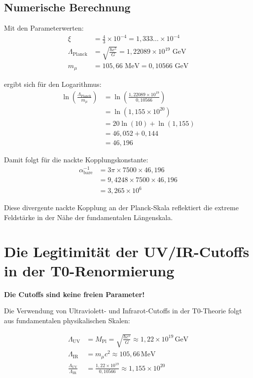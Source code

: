 \documentclass[12pt,a4paper]{article}
\theoremstyle{definition}
\begin{document}
	\subsection{Numerische Berechnung}
	
	Mit den Parameterwerten:
	\begin{align}
		\xi &= \frac{4}{3} \times 10^{-4} = 1{,}333\ldots \times 10^{-4}\\
		\Lambda_{\text{Planck}} &= \sqrt{\frac{\hbar c^5}{G}} = 1{,}22089 \times 10^{19} \text{ GeV}\\
		m_{\mu} &= 105{,}66 \text{ MeV} = 0{,}10566 \text{ GeV}
	\end{align}
	
	ergibt sich für den Logarithmus:
	\begin{align}
		\ln\left(\frac{\Lambda_{\text{Planck}}}{m_{\mu}}\right) &= \ln\left(\frac{1{,}22089 \times 10^{19}}{0{,}10566}\right)\\
		&= \ln(1{,}155 \times 10^{20})\\
		&= 20 \ln(10) + \ln(1{,}155)\\
		&= 46{,}052 + 0{,}144\\
		&= 46{,}196
	\end{align}
	
	Damit folgt für die nackte Kopplungskonstante:
	\begin{align}
		\alpha_{\text{bare}}^{-1} &= 3\pi \times 7500 \times 46{,}196\\
		&= 9{,}4248 \times 7500 \times 46{,}196\\
		&= 3{,}265 \times 10^6
	\end{align}
	
	Diese divergente nackte Kopplung an der Planck-Skala reflektiert die extreme Feldstärke in der Nähe der fundamentalen Längenskala.
	
	\section{Die Legitimität der UV/IR-Cutoffs in der T0-Renormierung}
	
	\begin{tcolorbox}[colback=blue!5!white,colframe=blue!75!black]
		\textbf{Die Cutoffs sind keine freien Parameter!}
	\end{tcolorbox}
	
	Die Verwendung von Ultraviolett- und Infrarot-Cutoffs in der T0-Theorie folgt aus fundamentalen physikalischen Skalen:
	
	\begin{align}
		\Lambda_{\mathrm{UV}} &= M_{\mathrm{Pl}} = \sqrt{\frac{\hbar c^5}{G}} \approx 1{,}22 \times 10^{19}\,\mathrm{GeV} \\
		\Lambda_{\mathrm{IR}} &= m_\mu c^2 \approx 105{,}66\,\mathrm{MeV} \\
		\frac{\Lambda_{\mathrm{UV}}}{\Lambda_{\mathrm{IR}}} &= \frac{1{,}22 \times 10^{19}}{0{,}10566} \approx 1{,}155 \times 10^{20}
	\end{align}
	
\end{document}
